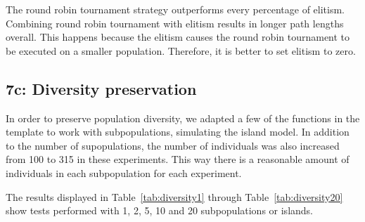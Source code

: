 \documentclass{report}
\begin{document}
The round robin tournament strategy outperforms every percentage of elitism. Combining round robin tournament with elitism results in longer path lengths overall. This happens because the elitism causes the round robin tournament to be executed on a smaller population. Therefore, it is better to set elitism to zero.


\subsection{7c: Diversity preservation}
In order to preserve population diversity, we adapted a few of the functions in the template to work with subpopulations, simulating the island model. In addition to the number of supopulations, the number of individuals was also increased from 100 to 315 in these experiments. This way there is a reasonable amount of individuals in each subpopulation for each experiment.

The results displayed in Table~\ref{tab:diversity1} through Table~\ref{tab:diversity20} show tests performed with 1, 2, 5, 10 and 20 subpopulations or islands.

\begin{table}[H]
	\centering
	\caption{Results when using a single subpopulation.}
	\label{tab:diversity1}
\end{table}
\end{document}
